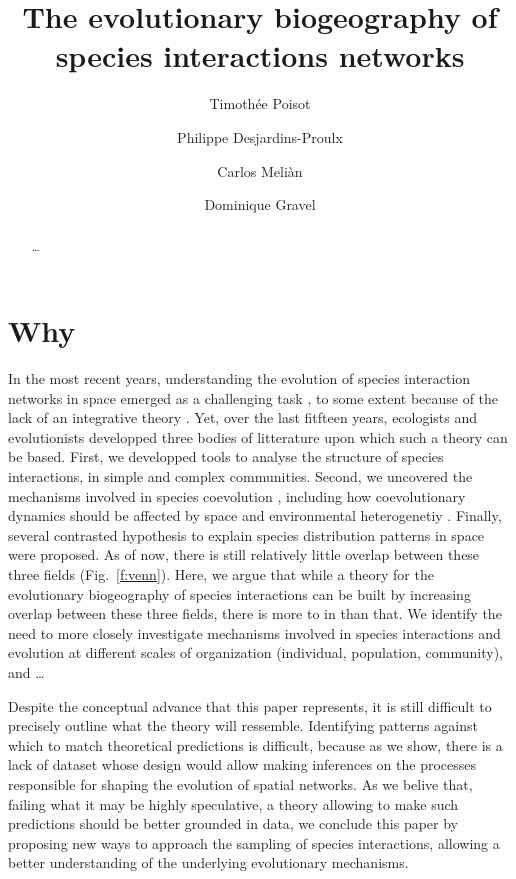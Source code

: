 \documentclass[11pt,oneside]{article}
\title{The evolutionary biogeography of species interactions networks}
\author{Timoth\'ee Poisot \and Philippe Desjardins-Proulx \and Carlos Meli\`an \and Dominique Gravel}
\begin{document}
\maketitle
\begin{abstract}
	\ldots 
\end{abstract}
\onehalfspacing\clearpage


\section{Why}

In the most recent years, understanding the evolution of species interaction
networks in space emerged as a challenging task \parencite{Pillai2011}, to some
extent because of the lack of an integrative theory \parencite{Urban2008}. Yet, over the last fitfteen
years, ecologists and evolutionists developped three bodies of litterature upon
which such a theory can be based. First, we developped tools to analyse the
structure of species interactions, in simple and complex communities. Second, we
uncovered the mechanisms involved in species coevolution
\parencite{Thompson1994a}, including how coevolutionary dynamics should be
affected by space and environmental heterogenetiy \parencite{Thompson2005}.
Finally, several contrasted hypothesis to explain species distribution patterns
in space were proposed. As of now, there is still relatively little overlap
between these three fields (Fig.~\ref{f:venn}). Here, we argue that while a
theory for the evolutionary biogeography of species interactions can be built by
increasing overlap between these three fields, there is more to in than that. We
identify the need to more closely investigate mechanisms involved in species interactions and
evolution at different scales of organization (individual, population, community), and \ldots 

Despite the conceptual advance that this paper represents, it is still difficult
to precisely outline what the theory will ressemble. Identifying patterns
against which to match theoretical predictions is difficult, because as we show,
there is a lack of dataset whose design would allow making inferences on the
processes responsible for shaping the evolution of spatial networks. As we
belive that, failing what it may be highly speculative, a theory allowing to
make such predictions should be better grounded in data, we conclude this paper
by proposing new ways to approach the sampling of species interactions, allowing
a better understanding of the underlying evolutionary mechanisms.
\end{document}
